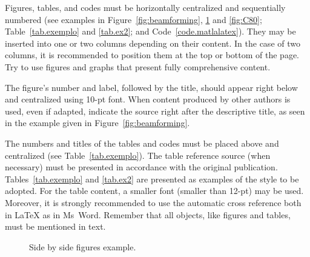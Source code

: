 \documentclass[12pt, a4paper, twoside, twocolumn]{article}
\begin{document}
Figures, tables, and codes must be horizontally centralized and sequentially numbered (see examples in Figure~\ref{fig:beamforming}, \ref{subfig.exemplo} and \ref{fig:C80}; Table~\ref{tab.exemplo} and \ref{tab.ex2}; and  Code~\ref{code.matlalatex}). They may be inserted into one or two columns depending on their content. In the case of two columns, it is recommended to position them at the top or bottom of the page. Try to use figures and graphs that present fully comprehensive content. 

The figure's number and label, followed by the title, should appear right below and centralized using 10-pt font. When content produced by other authors is used, even if adapted, indicate the source right after the descriptive title, as seen in the example given in Figure~\ref{fig:beamforming}.

The numbers and titles of the tables and codes must be placed above and centralized (see Table~\ref{tab.exemplo}). The table reference source (when necessary) must be presented in accordance with the original publication. Tables~\ref{tab.exemplo} and \ref{tab.ex2} are presented as examples of the style to be adopted. For the table content, a smaller font (smaller than 12-pt) may be used. Moreover, it is strongly recommended to use the automatic cross reference both in \LaTeX{} as in Ms~Word. Remember that all objects, like figures and tables, must be mentioned in text.

\begin{figure}[H]
\vspace{-0.8em}
  \centering 
	\qquad
  \vspace{-0.4em}
  \caption{Side by side figures example.}
  \label{subfig.exemplo}
\end{figure}
\end{document}

